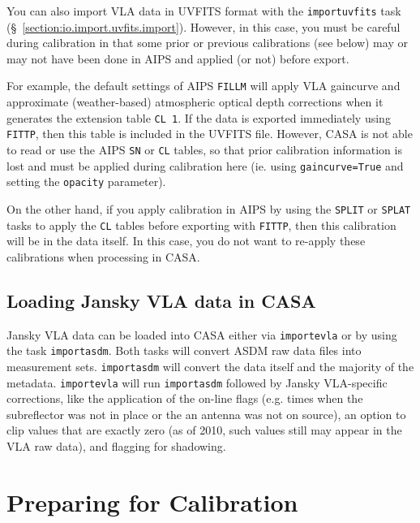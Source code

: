 You can also import VLA data in UVFITS format with the 
{\tt importuvfits} task (\S~\ref{section:io.import.uvfits.import}).
However, in this case, you must be careful during calibration in
that some prior or previous calibrations (see below) may or may not
have been done in AIPS and applied (or not) before export.

For example, the default settings of AIPS {\tt FILLM} will apply
VLA gaincurve and approximate (weather-based) atmospheric optical
depth corrections when it generates the extension table {\tt CL 1}.
If the data is exported immediately using {\tt FITTP}, then this 
table is included in the UVFITS file.  However, CASA is not able
to read or use the AIPS {\tt SN} or {\tt CL} tables, so that 
prior calibration information is lost and must be applied during
calibration here (ie. using {\tt gaincurve=True} and setting the
{\tt opacity} parameter).  

On the other hand, if you apply calibration in AIPS by using the
{\tt SPLIT} or {\tt SPLAT} tasks to apply the {\tt CL} tables before
exporting with {\tt FITTP}, then this calibration will be in the
data itself.  In this case, you do not want to re-apply these
calibrations when processing in CASA.

\subsection{Loading Jansky VLA data in CASA}
\label{section:cal.flow.evla}

Jansky VLA data can be loaded into CASA either via {\tt importevla} or by
using the task {\tt importasdm}. Both tasks will convert ASDM raw data
files into measurement sets. {\tt importasdm} will convert the data
itself and the majority of the metadata. {\tt importevla} will run
{\tt importasdm} followed by Jansky VLA-specific corrections, like the
application of the on-line flags (e.g. times when the subreflector was
not in place or the an antenna was not on source), an option to clip
values that are exactly zero (as of 2010, such values still may appear
in the VLA raw data), and flagging for shadowing.


\section{Preparing for Calibration}
\label{section:cal.prior}


